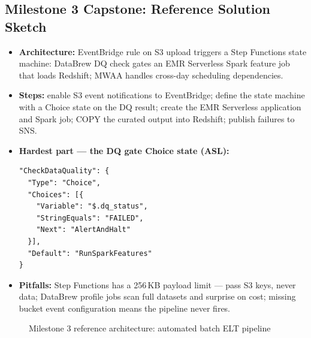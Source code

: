 \documentclass[11pt, a4paper]{article}
\begin{document}
\subsection*{Milestone 3 Capstone: Reference Solution Sketch}
\begin{itemize}[label=-, itemsep=0pt]
    \item \textbf{Architecture:} EventBridge rule on S3 upload triggers a Step Functions state machine: DataBrew DQ check gates an EMR Serverless Spark feature job that loads Redshift; MWAA handles cross-day scheduling dependencies.
    \item \textbf{Steps:} enable S3 event notifications to EventBridge; define the state machine with a Choice state on the DQ result; create the EMR Serverless application and Spark job; COPY the curated output into Redshift; publish failures to SNS.
    \item \textbf{Hardest part --- the DQ gate Choice state (ASL):}
\begin{lstlisting}
"CheckDataQuality": {
  "Type": "Choice",
  "Choices": [{
    "Variable": "$.dq_status",
    "StringEquals": "FAILED",
    "Next": "AlertAndHalt"
  }],
  "Default": "RunSparkFeatures"
}
\end{lstlisting}
    \item \textbf{Pitfalls:} Step Functions has a 256\,KB payload limit --- pass S3 keys, never data; DataBrew profile jobs scan full datasets and surprise on cost; missing bucket event configuration means the pipeline never fires.
\end{itemize}

\begin{figure}[htbp]
\centering
{}
\caption{Milestone 3 reference architecture: automated batch ELT pipeline}
\end{figure}
\end{document}

